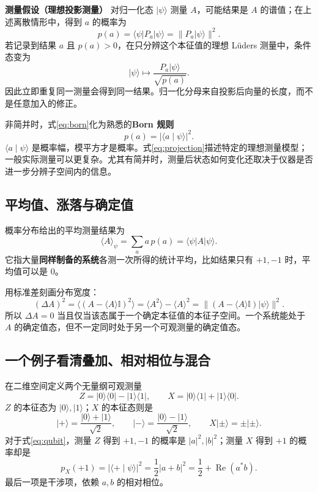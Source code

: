 \documentclass[a4paper,11pt]{article}
\numberwithin{equation}{section}
\newcommand{\I}{\mathbb I}
\newcommand{\ket}[1]{\lvert #1\rangle}
\newcommand{\bra}[1]{\langle #1\rvert}
\newcommand{\braket}[2]{\langle #1\mid #2\rangle}
\newcommand{\mel}[3]{\langle #1\rvert #2\lvert #3\rangle}
\newcommand{\avg}[1]{\langle #1\rangle}
\newcommand{\norm}[1]{\lVert #1\rVert}
\newcommand{\abs}[1]{\lvert #1\rvert}
\newcommand{\important}[1]{\par\noindent\textbf{#1}\quad}
\begin{document}
\important{测量假设（理想投影测量）}
对归一化态 $\ket{\psi}$ 测量 $A$，可能结果是 $A$ 的谱值；在上述离散情形中，得到 $a$ 的概率为
\begin{equation}\label{eq:born}
  \boxed{p(a)=\mel{\psi}{P_a}{\psi}=\norm{P_a\ket{\psi}}^2.}
\end{equation}
若记录到结果 $a$ 且 $p(a)>0$，在只分辨这个本征值的理想 Lüders 测量中，条件态变为
\begin{equation}\label{eq:projection}
  \ket{\psi}\longmapsto
  \frac{P_a\ket{\psi}}{\sqrt{p(a)}}.
\end{equation}
因此立即重复同一测量会得到同一结果。归一化分母来自投影后向量的长度，而不是任意加入的修正。

非简并时，式\eqref{eq:born}化为熟悉的\textbf{Born 规则}
\begin{equation}
  p(a)=\abs{\braket{a}{\psi}}^2.
\end{equation}
$\braket{a}{\psi}$ 是概率幅，模平方才是概率。式\eqref{eq:projection}描述特定的理想测量模型；一般实际测量可以更复杂。尤其有简并时，测量后状态如何变化还取决于仪器是否进一步分辨子空间内的信息。

\subsection{平均值、涨落与确定值}
概率分布给出的平均测量结果为
\begin{equation}\label{eq:expectation}
  \avg{A}_\psi=\sum_a a\,p(a)=\mel{\psi}{A}{\psi}.
\end{equation}
它指大量\textbf{同样制备的系统}各测一次所得的统计平均，比如结果只有 $+1,-1$ 时，平均值可以是 $0$。

用标准差刻画分布宽度：
\begin{equation}\label{eq:variance}
  (\Delta A)^2=\avg{(A-\avg{A}\I)^2}
  =\avg{A^2}-\avg{A}^2
  =\norm{(A-\avg{A}\I)\ket{\psi}}^2.
\end{equation}
所以 $\Delta A=0$ 当且仅当该态属于一个确定本征值的本征子空间。一个系统能处于 $A$ 的确定值态，但不一定同时处于另一个可观测量的确定值态。

\subsection{一个例子看清叠加、相对相位与混合}
在二维空间定义两个无量纲可观测量
\begin{equation}\label{eq:ZX}
  Z=\ket{0}\bra{0}-\ket{1}\bra{1},\qquad
  X=\ket{0}\bra{1}+\ket{1}\bra{0}.
\end{equation}
$Z$ 的本征态为 $\ket{0},\ket{1}$；$X$ 的本征态则是
\begin{equation}\label{eq:pm}
  \ket{+}=\frac{\ket{0}+\ket{1}}{\sqrt2},\qquad
  \ket{-}=\frac{\ket{0}-\ket{1}}{\sqrt2},\qquad
  X\ket{\pm}=\pm\ket{\pm}.
\end{equation}
对于式\eqref{eq:qubit}，测量 $Z$ 得到 $+1,-1$ 的概率是 $\abs{a}^2,\abs{b}^2$；测量 $X$ 得到 $+1$ 的概率却是
\begin{equation}
  p_X(+1)=\abs{\braket{+}{\psi}}^2
  =\frac12\abs{a+b}^2
  =\frac12+\operatorname{Re}(a^*b).
\end{equation}
最后一项是干涉项，依赖 $a,b$ 的相对相位。
\end{document}
